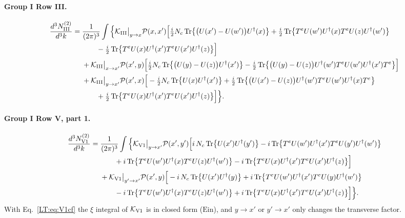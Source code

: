 \documentclass[10pt]{article}
\numberwithin{equation}{section}
\newcommand{\PP}{\mathcal P}
\newcommand{\Tr}{{\rm Tr}}
\newcommand{\Ud}{U^\dagger}
\begin{document}
\paragraph{Group I Row III.}
\begin{align}
\frac{d^3N^{(2)}_{\rm III}}{d^3k}={}&\frac{1}{(2\pi)^3}\int\Big\{\mathcal K_{\rm III}\big|_{y\to x}\PP(x,x')\Big[\tfrac{i}{2}N_c\,\Tr\big\{\big(U(x')-U(w')\big)\Ud(x)\big\}+\tfrac{i}{2}\,\Tr\big\{T^eU(w')\Ud(x)T^eU(z)\Ud(w')\big\}\notag\\
&\qquad-\tfrac{i}{2}\,\Tr\big\{T^eU(x)\Ud(x')T^eU(x')\Ud(z)\big\}\Big]\notag\\
&+\mathcal K_{\rm III}\big|_{x\to x'}\PP(x',y)\Big[\tfrac{i}{2}N_c\,\Tr\big\{\big(U(y)-U(z)\big)\Ud(x')\big\}-\tfrac{i}{2}\,\Tr\big\{\big(U(y)-U(z)\big)\Ud(w')T^eU(w')\Ud(x')T^e\big\}\Big]\notag\\
&+\mathcal K_{\rm III}\big|_{y\to x'}\PP(x',x)\Big[-\tfrac{i}{2}N_c\,\Tr\big\{U(x)\Ud(x')\big\}+\tfrac{i}{2}\,\Tr\big\{\big(U(x')-U(z)\big)\Ud(w')T^eU(w')\Ud(x)T^e\big\}\notag\\
&\qquad+\tfrac{i}{2}\,\Tr\big\{T^eU(x)\Ud(x')T^eU(x')\Ud(z)\big\}\Big]\Big\}.
\end{align}
\paragraph{Group I Row V, part 1.}
\begin{align}
\frac{d^3N^{(2)}_{\rm V1}}{d^3k}={}&\frac{1}{(2\pi)^3}\int\Big\{\mathcal K_{\rm V1}\big|_{y\to x'}\PP(x',y')\Big[i\,N_c\,\Tr\big\{U(x')\Ud(y')\big\}-i\,\Tr\big\{T^eU(w')\Ud(x')T^eU(y')\Ud(w')\big\}\notag\\
&\qquad+i\,\Tr\big\{T^eU(w')\Ud(x)T^eU(z)\Ud(w')\big\}-i\,\Tr\big\{T^eU(x)\Ud(x')T^eU(x')\Ud(z)\big\}\Big]\notag\\
&+\mathcal K_{\rm V1}\big|_{y'\to x'}\PP(x',y)\Big[-i\,N_c\,\Tr\big\{U(x')\Ud(y)\big\}+i\,\Tr\big\{T^eU(w')\Ud(x')T^eU(y)\Ud(w')\big\}\notag\\
&\qquad-i\,\Tr\big\{T^eU(w')\Ud(x)T^eU(z)\Ud(w')\big\}+i\,\Tr\big\{T^eU(x)\Ud(x')T^eU(x')\Ud(z)\big\}\Big]\Big\}.
\end{align}
With Eq.~\eqref{LT:eq:V1cf} the $\xi$ integral of $\mathcal K_{\rm V1}$ is in closed form ($\mathrm{Ein}$), and $y\to x'$ or $y'\to x'$ only changes the transverse factor.
\end{document}
